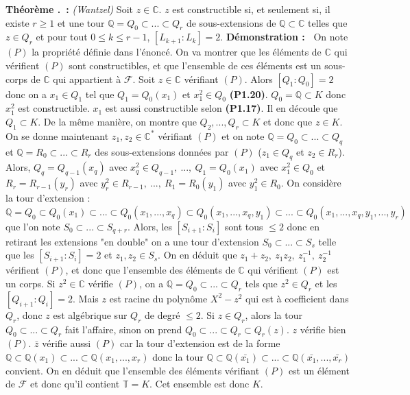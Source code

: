 \documentclass[5pt,a4paper]{article}
\newcounter{prop}[section]
\newcounter{thm}[section]
\renewcommand{\thethm}{\thesection.\arabic{thm}}
\newcommand{\thm}[1]{\stepcounter{thm}\noindent\textbf{Théorème \thethm ~:} #1 \newline}
\newcommand{\demo}[1]{\textbf{Démonstration :~} #1 \newline}
\begin{document}
\begin{onehalfspacing}
\thm{\textit{(Wantzel)} Soit $z \in \mathbb{C}$. $z$ est constructible si, et seulement si, il existe $r \geq 1$ et une tour $\mathbb{Q} = Q_0 \subset ... \subset Q_r$ de sous-extensions de $\mathbb{Q} \subset \mathbb{C}$ telles que $z \in Q_r$ et pour tout $0 \leq k \leq r-1$, $[L_{k+1} : L_k] = 2$.}
\demo{On note $(P)$ la propriété définie dans l'énoncé. On va montrer que les éléments de $\mathbb{C}$ qui vérifient $(P)$ sont constructibles, et que l'ensemble de ces éléments est un sous-corps de $\mathbb{C}$ qui appartient à $\mathcal{F}$. Soit $z \in \mathbb{C}$ vérifiant $(P)$. Alors $[Q_1 : Q_0] = 2$ donc on a $x_1 \in Q_1$ tel que $Q_1 = Q_0(x_1)$ et $x_1^2 \in Q_0$ \textbf{(P1.20)}. $Q_0 = \mathbb{Q} \subset K$ donc $x_1^2$ est constructible. $x_1$ est aussi constructible selon \textbf{(P1.17)}. Il en découle que $Q_1 \subset K$. De la même manière, on montre que $Q_2, ..., Q_r \subset K$ et donc que $z \in K$. On se donne maintenant $z_1, z_2 \in \mathbb{C}^*$ vérifiant $(P)$ et on note $\mathbb{Q} = Q_0 \subset ... \subset Q_q$ et $\mathbb{Q} = R_0 \subset ... \subset R_r$ des sous-extensions données par $(P)$ ($z_1 \in Q_q$ et $z_2 \in R_r$). Alors, $Q_q = Q_{q-1}(x_q)$ avec $x_q^2 \in Q_{q-1},~...,~Q_1 = Q_0(x_1)$ avec $x_1^2 \in Q_0$ et $R_r = R_{r-1}(y_r)$ avec $y_r^2 \in R_{r-1},~...,~R_1 = R_0(y_1)$ avec $y_1^2 \in R_0$. On considère la tour d'extension : $\mathbb{Q} = Q_0 \subset Q_0(x_1) \subset ... \subset Q_0(x_1, ...,x_q) \subset Q_0(x_1, ...,x_q,y_1) \subset ... \subset Q_0(x_1, ...,x_q,y_1, ...,y_r)$ que l'on note $S_0 \subset ... \subset S_{q+r}$. Alors, les $[S_{i+1} : S_i]$ sont tous $\leq 2$ donc en retirant les extensions "en double" on a une tour d'extension $S_0 \subset ... \subset S_{s}$ telle que les $[S_{i+1} : S_i] = 2$ et $z_1, z_2 \in S_s$. On en déduit que $z_1 + z_2,~z_1z_2,~z_1^{-1},~z_2^{-1}$ vérifient $(P)$, et donc que l'ensemble des éléments de $\mathbb{C}$ qui vérifient $(P)$ est un corps. Si $z^2 \in \mathbb{C}$ vérifie $(P)$, on a $\mathbb{Q} = Q_0 \subset ... \subset Q_r$ tels que $z^2 \in Q_r$ et les $[Q_{i+1} : Q_i] = 2$. Mais $z$ est racine du polynôme $X^2 - z^2$ qui est à coefficient dans $Q_r$, donc $z$ est algébrique sur $Q_r$ de degré $\leq 2$. Si $z \in Q_r$, alors la tour $Q_0 \subset ... \subset Q_r$ fait l'affaire, sinon on prend $Q_0 \subset ... \subset Q_r \subset Q_r(z)$. $z$ vérifie bien $(P)$. $\bar{z}$ vérifie aussi $(P)$ car la tour d'extension est de la forme $\mathbb{Q} \subset \mathbb{Q}(x_1) \subset ... \subset \mathbb{Q}(x_1, ..., x_r)$ donc la tour $\mathbb{Q} \subset \mathbb{Q}(\bar{x_1}) \subset ... \subset \mathbb{Q}(\bar{x_1}, ..., \bar{x_r})$ convient. On en déduit que l'ensemble des éléments vérifiant $(P)$ est un élément de $\mathcal{F}$ et donc qu'il contient $\mathbb{T} = K$. Cet ensemble est donc $K$.}


\end{onehalfspacing}
\end{document}
